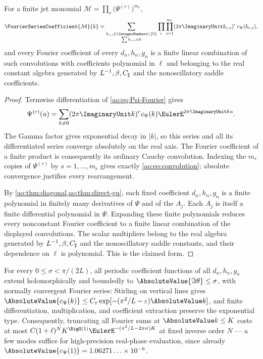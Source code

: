 \begin{proposition}
\label{ao:prop:convolutions}
For a finite jet monomial
$\mathcal M=\prod_{r}\bigl(\Psi^{(r)}\bigr)^{m_r}$,
\begin{equation}
 \FourierSeriesCoefficient{\mathcal M}{k}
 =\sum_{\substack{k_{r,s}\in\IntegerNumbers\setminus\{0\}\\ \sum k_{r,s}=k}}
 \prod_{r}\prod_{s=1}^{m_r}
 (2\pi\ImaginaryUnit k_{r,s})^{r}\,\Psihat(k_{r,s}),
 \label{ao:eq:convolution}
\end{equation}
and every Fourier coefficient of every $d_n,h_n,g_n$ is a finite
linear combination of such convolutions with coefficients polynomial
in $\ell$ and belonging to the real constant algebra generated by
$L^{-1},\beta,C_{\sharp}$ and the nonoscillatory saddle coefficients.
\end{proposition}

\begin{proof}
Termwise differentiation of \eqref{ao:eq:Psi-Fourier} gives
\[
 \Psi^{(r)}(u)=\sum_{k\ne0}(2\pi\ImaginaryUnit k)^r
 \Psihat(k)\EulerE^{2\pi\ImaginaryUnit ku}.
\]
The Gamma factor gives exponential decay in $|k|$, so this series and
all its differentiated series converge absolutely on the real axis.
The Fourier coefficient of a finite product is consequently its
ordinary Cauchy convolution.  Indexing the $m_r$ copies of
$\Psi^{(r)}$ by $s=1,\ldots,m_r$ gives exactly
\eqref{ao:eq:convolution}; absolute convergence justifies every
rearrangement.

By \cref{ao:thm:diagonal,ao:thm:direct-gn}, each fixed coefficient
$d_n,h_n,g_n$ is a finite polynomial in finitely many derivatives of
$\Psi$ and of the $A_j$.  Each $A_j$ is itself a finite differential
polynomial in $\Psi$.  Expanding these finite polynomials reduces
every nonconstant Fourier coefficient to a finite linear combination
of the displayed convolutions.  The scalar multipliers belong to the
real algebra generated by $L^{-1},\beta,C_{\sharp}$ and the
nonoscillatory saddle constants, and their dependence on $\ell$ is
polynomial.  This is the claimed form.
\end{proof}

\begin{proposition}
\label{ao:prop:strip}
For every $0\le\sigma<\pi/(2L)$, all periodic coefficient functions of
all $d_n,h_n,g_n$ extend holomorphically and boundedly to
$\AbsoluteValue{\Im\theta}\le\sigma$, with normally convergent Fourier series:
Stirling on vertical lines gives
$\AbsoluteValue{\Psihat(k)}\le C_\eps\exp[-(\pi^{2}/L-\eps)\AbsoluteValue k]$, and
finite differentiation, multiplication, and coefficient extraction preserve
the exponential type.  Consequently, truncating all Fourier sums at
$\AbsoluteValue k\le K$ costs at most
$C(1+\ell)^{N}K^{\BigO(1)}
\EulerE^{-(\pi^{2}/L-2\pi\sigma)K}$ at fixed inverse order $N$ --- a few
modes suffice for high-precision real-phase evaluation, since already
$\AbsoluteValue{\Psihat(1)}=1.06271\ldots\times10^{-6}$.
\end{proposition}

